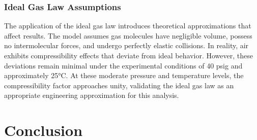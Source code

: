 \documentclass{article} %
\begin{document}
\begin{multicols}{2}
\subsubsection{Ideal Gas Law Assumptions}

The application of the ideal gas law introduces theoretical approximations that affect results. The model assumes gas molecules have negligible volume, possess no intermolecular forces, and undergo perfectly elastic collisions. In reality, air exhibits compressibility effects that deviate from ideal behavior. However, these deviations remain minimal under the experimental conditions of 40 psig and approximately 25°C. At these moderate pressure and temperature levels, the compressibility factor approaches unity, validating the ideal gas law as an appropriate engineering approximation for this analysis.
\section{Conclusion}
\label{conclusion}

\label{last_page}

\newpage


    
\end{multicols}
\end{document}
